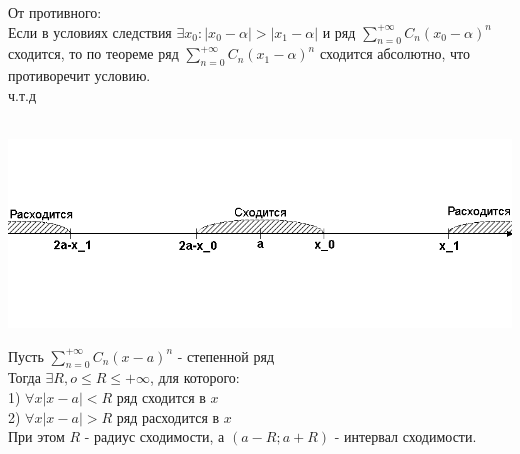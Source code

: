 \begin{Proof}
	От противного:\\
	Если в условиях следствия $\exists x_0 : |x_0 - \alpha| > |x_1 - \alpha|$ и ряд $\sum^{+\infty}_{n=0} C_n(x_0-\alpha)^n$ сходится, то по теореме ряд $\sum^{+\infty}_{n=0} C_n(x_1-\alpha)^n$ сходится абсолютно, что противоречит условию.\\
	ч.т.д\\
\end{Proof}

\begin{Note}~\\
	\includegraphics[width = 1\textwidth]{pictures/4_3_1.png}
\end{Note}

\begin{Th}
	Пусть $\sum^{+\infty}_{n=0} C_n(x-a)^n$ - степенной ряд\\
	Тогда $\exists R, o \leq R \leq +\infty$, для которого:\\
	1) $\forall x |x-a| < R$ ряд сходится в $x$\\
	2) $\forall x |x-a| > R$ ряд расходится в $x$\\ 
	При этом $R$ - радиус сходимости,  а $(a-R;a+R)$ - интервал сходимости.
\end{Th}

